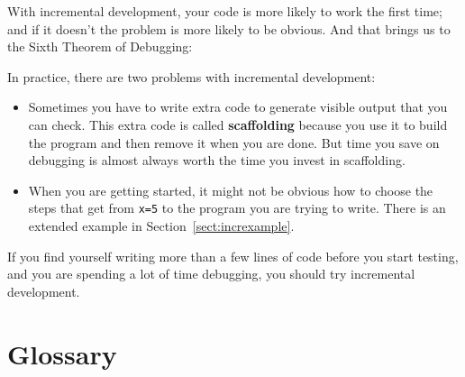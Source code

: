 \documentclass[main.tex]{subfiles}
\begin{document}

With incremental development, your code is more likely to work the first time; and if it doesn't the problem is more likely to be obvious.  And that brings us to the Sixth Theorem of Debugging:

\begin{quote}
\end{quote}

In practice, there are two problems with incremental development:

\begin{itemize}

\item Sometimes you have to write extra code to
generate visible output that you can check.  This extra code is
called {\bf scaffolding} because you use it to build the program
and then remove it when you are done.  But time you save on
debugging is almost always worth the time you invest in
scaffolding.


\item When you are getting started, it might not be obvious how to
choose the steps that get from {\tt x=5} to the program you are trying
to write.  There is an extended example in Section~\ref{sect:increxample}.

\end{itemize}

If you find yourself writing more than a few lines of code before
you start testing, and you are spending a lot of time debugging,
you should try incremental development.


\section{Glossary}
\end{document}

